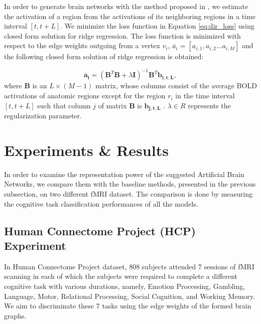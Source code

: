 \documentclass[runningheads]{llncs}
\begin{document}

In order to generate brain networks with the method proposed in \cite{onal2015modeling}, we estimate the activation of a region from the activations of its neighboring regions in a time interval $[t, t+L]$. We minimize the loss function in Equation \ref{eq:dir_loss} using closed form solution for ridge regression. The loss function is minimized with respect to the edge weights outgoing from a vertex $v_i$, $ \overline{a}_{i} = [ a_{i,1}, a_{i,2} ... a_{i,M} ]$ and the following closed form solution of ridge regression is obtained:

\begin{equation}
\mathbf{\overline{a}_{i}} = (\mathbf{B}^{T}\mathbf{B} + \lambda \mathbf{I})^{-1}\mathbf{B}^{T} \mathbf{b_{i,t,L}} ,
\end{equation}
where $\mathbf{B}$ is an $L \times (M-1)$ matrix, whose columns consist of the average BOLD activations of anatomic regions except for the region $r_i$ in the time interval $[t, t+L]$ such that column $j$ of matrix $\mathbf{B}$ is $\mathbf{b_{j,t,L}}$ . $\lambda \in R$ represents the regularization parameter. 

\section{Experiments \& Results}

In order to examine the representation power of the suggested Artificial Brain Networks,  we compare them with the baseline methods, presented in the previous subsection, on two different fMRI dataset. The comparison is done by measuring the cognitive task classification performances  of all the models.

\subsection{Human Connectome Project (HCP) Experiment}

In Human Connectome Project dataset, 808 subjects attended 7 sessions of fMRI scanning in each of which the subjects were required to complete a different cognitive task with various durations, namely, Emotion Processing, Gambling, Language, Motor, Relational Processing, Social Cognition, and Working Memory. We aim to discriminate these 7 tasks using the edge weights of the formed brain graphs. 
\end{document}
